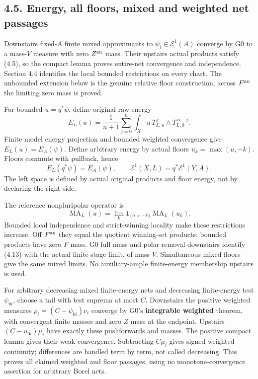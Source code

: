\documentclass[
  10pt,
]{article}
\begin{document}
\subsection{4.5. Energy, all floors, mixed and weighted net
passages}\label{energy-all-floors-mixed-and-weighted-net-passages}

Downstairs fixed-\(A\) finite mixed approximants to
\(\psi_i\in\mathcal E^1(A)\) converge by G0 to a mass-\(V\) measure with
zero \(Z^{\rm an}\) mass. Their upstairs actual products satisfy (4.5),
so the compact lemma proves entire-net convergence and independence.
Section 4.4 identifies the local bounded restrictions on every chart.
The unbounded extension below is the genuine relative floor
construction; across \(F^{\rm an}\) the limiting zero mass is proved.

For bounded \(u=q^*\psi\), define original raw energy
\[E_L(u)=\frac1{n+1}\sum_{j=0}^n
\int_X u\,T_{L,u}^{\,j}\wedge T_{L,0}^{\,n-j}. \tag{4.11}\] Finite model
energy projection and bounded weighted convergence give
\(E_L(u)=E_A(\psi)\). Define arbitrary energy by actual floors
\(u_k=\max(u,-k)\). Floors commute with pullback, hence
\[E_L(q^*\psi)=E_A(\psi),\qquad
\mathcal E^1(X,L)=q^*\mathcal E^1(Y,A). \tag{4.12}\] The left space is
defined by actual original products and floor energy, not by declaring
the right side.

The reference nonpluripolar operator is \[\operatorname{MA}_L(u)=\lim_k
\mathbf1_{\{u>-k\}}\operatorname{MA}_L(u_k). \tag{4.13}\] Bounded local
independence and strict-winning locality make these restrictions
increase. Off \(F^{\rm an}\) they equal the quotient winning-set
products; bounded products have zero \(F\) mass. G0 full mass and polar
removal downstairs identify (4.13) with the actual finite-stage limit,
of mass \(V\). Simultaneous mixed floors give the same mixed limits. No
auxiliary-ample finite-energy membership upstairs is used.

For arbitrary decreasing mixed finite-energy nets and decreasing
finite-energy test \(\psi_{0i}\), choose a tail with test suprema at
most \(C\). Downstairs the positive weighted measures
\(\rho_i=(C-\psi_{0i})\nu_i\) converge by G0's \textbf{integrable
weighted} theorem, with convergent finite masses and zero \(Z\) mass at
the endpoint. Upstairs \((C-u_{0i})\mu_i\) have exactly these
pushforwards and masses. The positive compact lemma gives their weak
convergence. Subtracting \(C\mu_i\) gives signed weighted continuity;
differences are handled term by term, not called decreasing. This proves
all claimed weighted and floor passages, using no monotone-convergence
assertion for arbitrary Borel nets.
\end{document}
